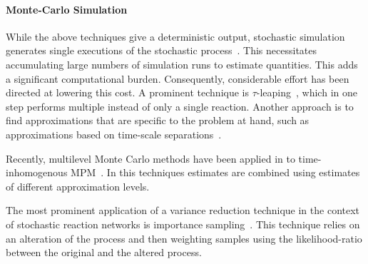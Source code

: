 \paragraph{Monte-Carlo Simulation}
While the above techniques give a deterministic output, stochastic simulation generates
single executions of the stochastic process~\cite{gillespie1977exact}.
This necessitates accumulating large numbers of simulation runs to estimate
quantities.
This adds a significant computational burden. Consequently, considerable effort
has been directed at lowering this cost.
A prominent technique is $\tau$-leaping~\cite{gillespie2001approximate},
which in one step performs multiple instead of only a single reaction.
Another approach is to find approximations that are specific to the problem at hand,
such as approximations based on time-scale separations~\cite{cao2005slow,bortolussi2015efficient}.

Recently, multilevel Monte Carlo methods have been applied in to time-inhomogenous
\ac{MPM}~\cite{anderson2018low}. In this techniques estimates are combined
using estimates of different approximation levels.


The most prominent application of a variance reduction technique in the context
of stochastic reaction networks is importance sampling~\cite{kuwahara2008efficient}.
This technique relies on an alteration of the process and then weighting samples
using the likelihood-ratio between the original and the altered process.
% 





